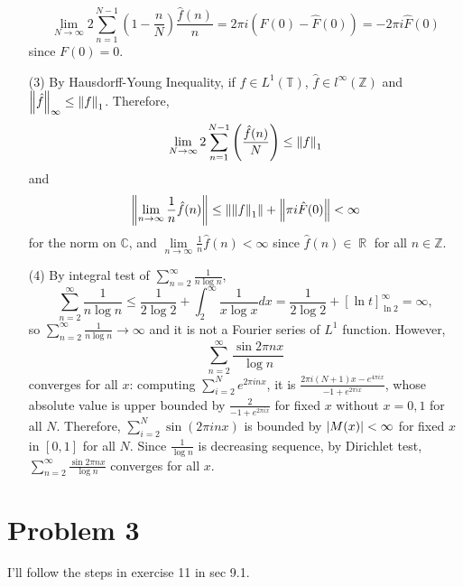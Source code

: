 \documentclass{article}
\DeclareMathOperator{\rr}{\mathbb{R}}
\begin{document}
\begin{enumerate}
\begin{equation*}
\lim\limits_{N\rightarrow\infty}2\sum\limits_{n=1}^{N-1}\left(1-\frac{n}{N}\right)\frac{\hat{f}(n)}{n}=2\pi i(F(0)-\hat{F}(0))=-2\pi i \hat{F}(0)
\end{equation*}
since $F(0)=0$.
\item[(3)] By Hausdorff-Young Inequality, if $f\in L^1(\mathbb{T})$, $ \hat{f}\in l^\infty(\mathbb{Z})$ and $\norm{\hat{f}}_\infty\leq \norm{f}_1$. Therefore, 
\begin{equation*}
\lim\limits_{N\rightarrow\infty}2\sum\limits_{n=1}^{N-1}\left(\frac{\hat{f}(n)}{N}\right)\leq \norm{f}_1
\end{equation*}
and
\begin{equation*}
\norm{\lim\limits_{n\rightarrow \infty} \frac{1}{n}\hat{f}(n)}\leq \norm{\norm{f}_1}+\norm{\pi i \hat{F}(0)}<\infty
\end{equation*}
for the norm on $\mathbb{C}$, and $\lim\limits_{n\rightarrow\infty} \frac{1}{n}\hat{f}(n)< \infty$ since $\hat{f}(n)\in \rr$ for all $n\in \mathbb{Z}$.
\item[(4)] By integral test of $\sum\limits_{n=2}^\infty \frac{1}{n\log n}$,
\begin{equation*}
\sum\limits_{n=2}^\infty \frac{1}{n\log n}\leq \frac{1}{2\log 2}+ \int_2^\infty \frac{1}{x\log x}dx=\frac{1}{2\log 2}+ \left[\ln t\right]_{\ln 2}^\infty = \infty, 
\end{equation*} 
so $\sum\limits_{n=2}^\infty \frac{1}{n\log n}\rightarrow \infty$ and it is not a Fourier series of $L^1$ function. However,
\begin{equation*}
\sum\limits_{n=2}^\infty \frac{\sin 2\pi n x}{\log n}
\end{equation*}
converges for all $x$: computing $\sum\limits_{i=2}^N e^{2\pi i n x}$, it is $ \frac{2\pi i (N+1)x-e^{4\pi i x}}{-1+e^{2\pi i x}}$, whose absolute value is upper bounded by $\frac{2}{-1+e^{2\pi i x}}$ for fixed $x$ without $x=0,1$ for all $N$. Therefore, $\sum\limits_{i=2}^N \sin(2\pi i n x)$ is bounded by $\abs{M(x)}<\infty$ for fixed $x$ in $[0, 1]$ for all $N$. Since $\frac{1}{\log n}$ is decreasing sequence, by Dirichlet test, $\sum\limits_{n=2}^\infty \frac{\sin 2\pi n x}{\log n}$ converges for all $x$.
\end{enumerate}
\section*{Problem 3}
I'll follow the steps in exercise 11 in sec 9.1.
\end{document}
